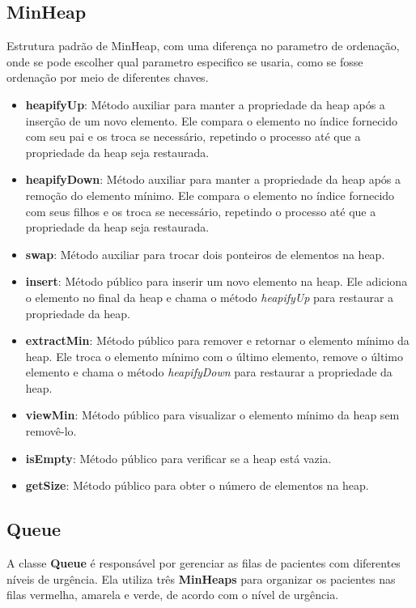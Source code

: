 \documentclass[a4paper,12pt]{article}
\begin{document}
\subsection{MinHeap}\hspace*{1cm}
Estrutura padrão de MinHeap, com uma diferença no parametro de ordenação, onde se pode escolher qual parametro especifico se usaria, 
como se fosse ordenação por meio de diferentes chaves.
\begin{itemize}
    \item \textbf{heapifyUp}: Método auxiliar para manter a propriedade da heap após a inserção de um novo elemento. Ele compara o elemento no índice fornecido com seu pai e os troca se necessário, repetindo o processo até que a propriedade da heap seja restaurada.
    \item \textbf{heapifyDown}: Método auxiliar para manter a propriedade da heap após a remoção do elemento mínimo. Ele compara o elemento no índice fornecido com seus filhos e os troca se necessário, repetindo o processo até que a propriedade da heap seja restaurada.
    \item \textbf{swap}: Método auxiliar para trocar dois ponteiros de elementos na heap.
    \item \textbf{insert}: Método público para inserir um novo elemento na heap. Ele adiciona o elemento no final da heap e chama o método \textit{heapifyUp} para restaurar a propriedade da heap.
    \item \textbf{extractMin}: Método público para remover e retornar o elemento mínimo da heap. Ele troca o elemento mínimo com o último elemento, remove o último elemento e chama o método \textit{heapifyDown} para restaurar a propriedade da heap.
    \item \textbf{viewMin}: Método público para visualizar o elemento mínimo da heap sem removê-lo.
    \item \textbf{isEmpty}: Método público para verificar se a heap está vazia.
    \item \textbf{getSize}: Método público para obter o número de elementos na heap.
\end{itemize}
\subsection{Queue}\hspace*{1cm}
A classe \textbf{Queue} é responsável por gerenciar as filas de pacientes com diferentes níveis de urgência. Ela utiliza três \textbf{MinHeaps} para organizar os pacientes nas filas vermelha, amarela e verde, de acordo com o nível de urgência.
\end{document}
